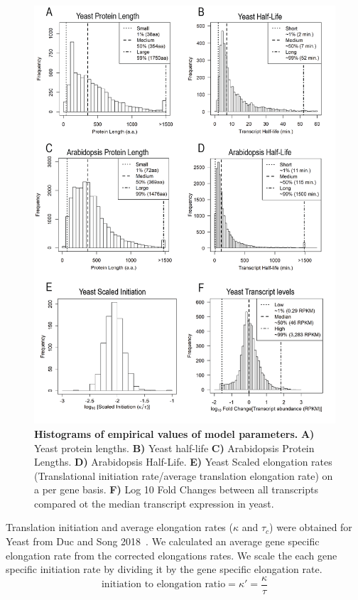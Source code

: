 \documentclass[10pt,letterpaper]{article}
\begin{document}
\begin{figure}[!h]
\begin{center}
\includegraphics[width=120mm]{Images/2023-07-04_parameter_histograms.png}
\caption{{\bf Histograms of empirical values of model parameters.}
{\bf A)} Yeast protein lengths. {\bf B)} Yeast half-life {\bf C)} Arabidopsis Protein Lengths. {\bf D)} Arabidopsis Half-Life. {\bf E)} Yeast Scaled elongation rates (Translational initiation rate/average translation elongation rate) on a per gene basis. {\bf F)} Log 10 Fold Changes between all transcripts compared ot the median transcript expression in yeast. }
\label{fig2}
\end{center}
\end{figure}


Translation initiation and average elongation rates ($\kappa$ and $\tau_c$) were obtained for Yeast from Duc and Song 2018~\cite{RN13}. 
We calculated an average gene specific elongation rate from the corrected elongations rates. We scale the each gene specific initiation rate by dividing it by the gene specific elongation rate.
\begin{equation}
	\text{initiation to elongation ratio} = \kappa' = \frac{\kappa}{\tau}
\end{equation}
\end{document}
